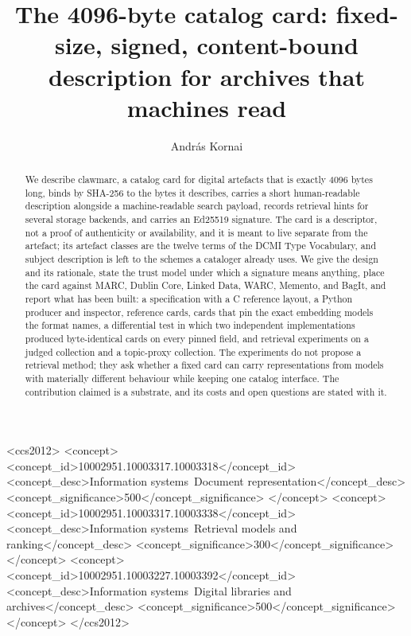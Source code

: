 \documentclass[sigconf]{acmart}
\begin{document}
\title{The 4096-byte catalog card: fixed-size, signed, content-bound description for archives that machines read}

\author{Andr\'as Kornai}

\begin{abstract}
We describe clawmarc, a catalog card for digital artefacts that is exactly
4096 bytes long, binds by SHA-256 to the bytes it describes, carries a short
human-readable description alongside a machine-readable search payload,
records retrieval hints for several storage backends, and carries an Ed25519
signature. The card is a descriptor, not a proof of authenticity or
availability, and it is meant to live separate from the artefact; its
artefact classes are the twelve terms of the DCMI Type Vocabulary, and subject
description is left to the schemes a cataloger already uses. We give the
design and its rationale, state the trust model under which a signature means
anything, place the card against MARC, Dublin Core, Linked Data, WARC,
Memento, and BagIt, and report what has been built: a specification with a C
reference layout, a Python producer and inspector, reference cards, cards
that pin the exact embedding models the format names, a differential test in
which two independent implementations produced byte-identical cards on every
pinned field, and retrieval experiments on a judged collection and a
topic-proxy collection. The experiments do not propose a retrieval method;
they ask whether a fixed card can carry representations from models with
materially different behaviour while keeping one catalog interface. The
contribution claimed is a substrate, and its costs and open questions are
stated with it.
\end{abstract}

\begin{CCSXML}
<ccs2012>
<concept>
<concept_id>10002951.10003317.10003318</concept_id>
<concept_desc>Information systems~Document representation</concept_desc>
<concept_significance>500</concept_significance>
</concept>
<concept>
<concept_id>10002951.10003317.10003338</concept_id>
<concept_desc>Information systems~Retrieval models and ranking</concept_desc>
<concept_significance>300</concept_significance>
</concept>
<concept>
<concept_id>10002951.10003227.10003392</concept_id>
<concept_desc>Information systems~Digital libraries and archives</concept_desc>
<concept_significance>500</concept_significance>
</concept>
</ccs2012>
\end{CCSXML}
\end{document}

